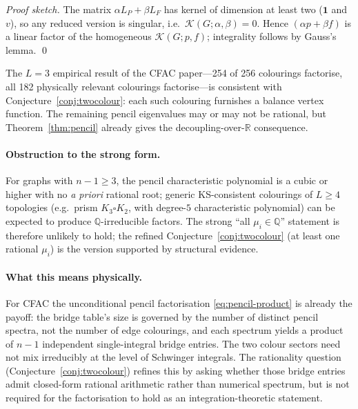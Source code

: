 \documentclass[11pt,a4paper]{article}
\theoremstyle{plain}
\begin{document}
\begin{proof}[Proof sketch]
The matrix $\alpha L_P + \beta L_F$ has kernel of dimension at
least two ($\mathbf 1$ and $v$), so any reduced version is
singular, i.e.\ $\mathcal{K}(G; \alpha, \beta) = 0$.  Hence
$(\alpha p + \beta f)$ is a linear factor of the homogeneous
$\mathcal{K}(G;p,f)$; integrality follows by Gauss's lemma.  \qed
\end{proof}

The $L = 3$ empirical result of the CFAC paper---254 of 256
colourings factorise, all 182 physically relevant
colourings factorise---is consistent with Conjecture~\ref{conj:twocolour}:
each such colouring furnishes a balance vertex function.  The
remaining pencil eigenvalues may or may not be rational, but
Theorem~\ref{thm:pencil} already gives the
decoupling-over-$\mathbb{R}$ consequence.

\paragraph{Obstruction to the strong form.}
For graphs with $n{-}1 \geq 3$, the pencil characteristic
polynomial is a cubic or higher with no \emph{a priori} rational
root; generic KS-consistent colourings of $L \geq 4$ topologies
(e.g.\ prism $K_3 \square K_2$, with degree-$5$ characteristic
polynomial) can be expected to produce $\mathbb{Q}$-irreducible
factors.  The strong ``all $\mu_i \in \mathbb{Q}$'' statement is
therefore unlikely to hold; the refined
Conjecture~\ref{conj:twocolour} (at least one rational $\mu_i$)
is the version supported by structural evidence.

\paragraph{What this means physically.}
For CFAC the unconditional pencil factorisation
\eqref{eq:pencil-product} is already the payoff: the bridge
table's size is governed by the number of distinct pencil spectra,
not the number of edge colourings, and each spectrum yields a
product of $n{-}1$ independent single-integral bridge entries.
The two colour sectors need not mix irreducibly at the level of
Schwinger integrals.  The rationality question
(Conjecture~\ref{conj:twocolour}) refines this by asking whether
those bridge entries admit closed-form rational arithmetic
rather than numerical spectrum, but is not required for the
factorisation to hold as an integration-theoretic statement.

\end{document}
